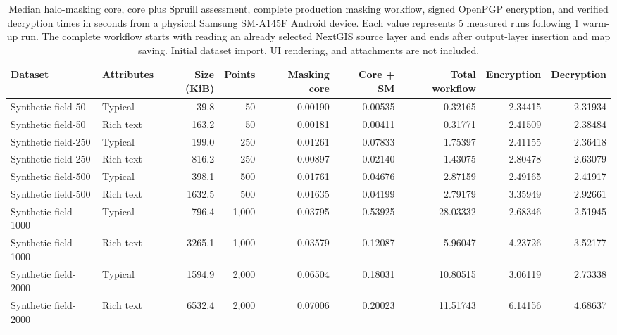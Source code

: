 \begin{table}[ht!]
\centering
\caption{Median halo-masking core, core plus Spruill assessment, complete production masking workflow, signed OpenPGP encryption, and verified decryption times in seconds from a physical Samsung SM-A145F Android device. Each value represents 5 measured runs following 1 warm-up run. The complete workflow starts with reading an already selected NextGIS source layer and ends after output-layer insertion and map saving. Initial dataset import, UI rendering, and attachments are not included.}
\label{tab:mobile-mask-encryption-times}
\begin{tabular}{llrrrrrrr}
\hline
Dataset & Attributes & Size (KiB) & Points & Masking core & Core + SM & Total workflow & Encryption & Decryption \\
\hline
Synthetic field-50 & Typical & 39.8 & 50 & 0.00190 & 0.00535 & 0.32165 & 2.34415 & 2.31934 \\
Synthetic field-50 & Rich text & 163.2 & 50 & 0.00181 & 0.00411 & 0.31771 & 2.41509 & 2.38484 \\
Synthetic field-250 & Typical & 199.0 & 250 & 0.01261 & 0.07833 & 1.75397 & 2.41155 & 2.36418 \\
Synthetic field-250 & Rich text & 816.2 & 250 & 0.00897 & 0.02140 & 1.43075 & 2.80478 & 2.63079 \\
Synthetic field-500 & Typical & 398.1 & 500 & 0.01761 & 0.04676 & 2.87159 & 2.49165 & 2.41917 \\
Synthetic field-500 & Rich text & 1632.5 & 500 & 0.01635 & 0.04199 & 2.79179 & 3.35949 & 2.92661 \\
Synthetic field-1000 & Typical & 796.4 & 1,000 & 0.03795 & 0.53925 & 28.03332 & 2.68346 & 2.51945 \\
Synthetic field-1000 & Rich text & 3265.1 & 1,000 & 0.03579 & 0.12087 & 5.96047 & 4.23726 & 3.52177 \\
Synthetic field-2000 & Typical & 1594.9 & 2,000 & 0.06504 & 0.18031 & 10.80515 & 3.06119 & 2.73338 \\
Synthetic field-2000 & Rich text & 6532.4 & 2,000 & 0.07006 & 0.20023 & 11.51743 & 6.14156 & 4.68637 \\
\hline
\end{tabular}
\end{table}
